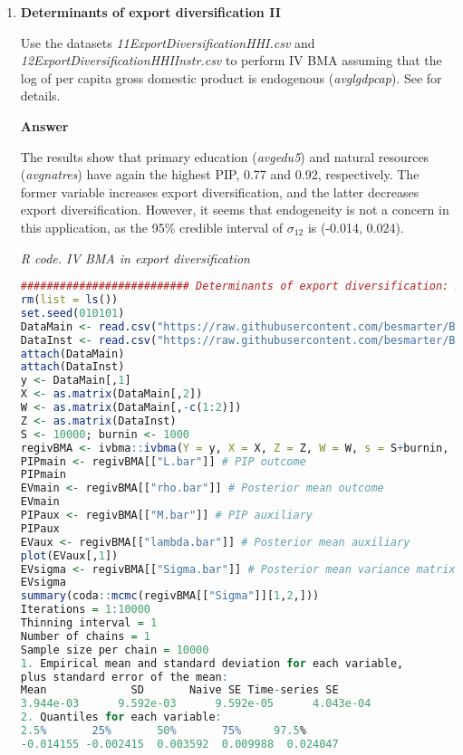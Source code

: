 \begin{enumerate}[leftmargin=*]
\item \textbf{Determinants of export diversification II}

Use the datasets \textit{11ExportDiversificationHHI.csv} and \textit{12ExportDiversificationHHIInstr.csv} to perform IV BMA assuming that the log of per capita gross domestic product is endogenous (\textit{avglgdpcap}). See \cite{Jetter2015} for details.  

\textbf{Answer}

The results show that primary education (\textit{avgedu5}) and natural resources (\textit{avgnatres}) have again the highest PIP, 0.77 and 0.92, respectively. The former variable increases export diversification, and the latter decreases export diversification. However, it seems that endogeneity is not a concern in this application, as the 95\% credible interval of $\sigma_{12}$ is (-0.014, 0.024).   


\begin{tcolorbox}[enhanced,width=4.67in,center upper,
	fontupper=\large\bfseries,drop shadow southwest,sharp corners]
	\textit{R code. IV BMA in export diversification}
	\begin{VF}
		\begin{lstlisting}[language=R]
########################## Determinants of export diversification: BMA normal model ########################## 
rm(list = ls())
set.seed(010101)
DataMain <- read.csv("https://raw.githubusercontent.com/besmarter/BSTApp/refs/heads/master/DataApp/11ExportDiversificationHHI.csv", sep = ",", header = TRUE, quote = "")
DataInst <- read.csv("https://raw.githubusercontent.com/besmarter/BSTApp/refs/heads/master/DataApp/12ExportDiversificationHHIInstr.csv", sep = ",", header = TRUE, quote = "")
attach(DataMain)
attach(DataInst)
y <- DataMain[,1]
X <- as.matrix(DataMain[,2])
W <- as.matrix(DataMain[,-c(1:2)])
Z <- as.matrix(DataInst)
S <- 10000; burnin <- 1000
regivBMA <- ivbma::ivbma(Y = y, X = X, Z = Z, W = W, s = S+burnin, b = burnin, odens = S, print.every = round(S/10), run.diagnostics = FALSE)
PIPmain <- regivBMA[["L.bar"]] # PIP outcome
PIPmain
EVmain <- regivBMA[["rho.bar"]] # Posterior mean outcome
EVmain
PIPaux <- regivBMA[["M.bar"]] # PIP auxiliary
PIPaux
EVaux <- regivBMA[["lambda.bar"]] # Posterior mean auxiliary
plot(EVaux[,1])
EVsigma <- regivBMA[["Sigma.bar"]] # Posterior mean variance matrix
EVsigma
summary(coda::mcmc(regivBMA[["Sigma"]][1,2,]))
Iterations = 1:10000
Thinning interval = 1 
Number of chains = 1 
Sample size per chain = 10000 
1. Empirical mean and standard deviation for each variable,
plus standard error of the mean:
Mean             SD       Naive SE Time-series SE 
3.944e-03      9.592e-03      9.592e-05      4.043e-04 
2. Quantiles for each variable:
2.5%       25%       50%       75%     97.5% 
-0.014155 -0.002415  0.003592  0.009988  0.024047 
\end{lstlisting}
	\end{VF}
\end{tcolorbox} 
	
\end{enumerate}